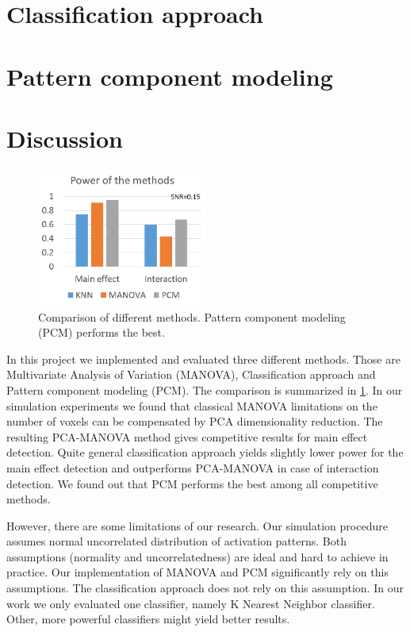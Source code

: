 \documentclass[paper=a4,fontsize=12pt]{scrartcl}
\renewcommand{\autoref}[1]{\cref{#1}}
\numberwithin{equation}{section} %
\numberwithin{figure}{section} %
\numberwithin{table}{section} %
\begin{document}
 

\FloatBarrier

\section{Classification approach}\label{sec:classification}



\section{Pattern component modeling}\label{sec:pcm}



\FloatBarrier

\section{Discussion}\label{sec:discussion}

\begin{figure}[ht]
\centering
\includegraphics[width=0.5\textwidth]{overall.png}
\caption{Comparison of different methods. Pattern component modeling (PCM) performs the best.}
\label{fig:overall}
\end{figure}

In this project we implemented and evaluated three different methods. Those are Multivariate Analysis of Variation (MANOVA), Classification approach and Pattern component modeling (PCM). The comparison is summarized in \autoref{fig:overall}. In our simulation experiments we found that classical MANOVA limitations on the number of voxels can be compensated by PCA dimensionality reduction. The resulting PCA-MANOVA method gives competitive results for main effect detection. Quite general classification approach yields slightly lower power for the main effect detection and outperforms PCA-MANOVA in case of interaction detection. We found out that PCM performs the best among all competitive methods.

However, there are some limitations of our research. Our simulation procedure assumes normal uncorrelated distribution of activation patterns. Both assumptions (normality and uncorrelatedness) are ideal and hard to achieve in practice. Our implementation of MANOVA and PCM significantly rely on this assumptions. The classification approach does not rely on this assumption. In our work we only evaluated one classifier, namely K Nearest Neighbor classifier. Other, more powerful classifiers might yield better results.

\FloatBarrier



\end{document}

